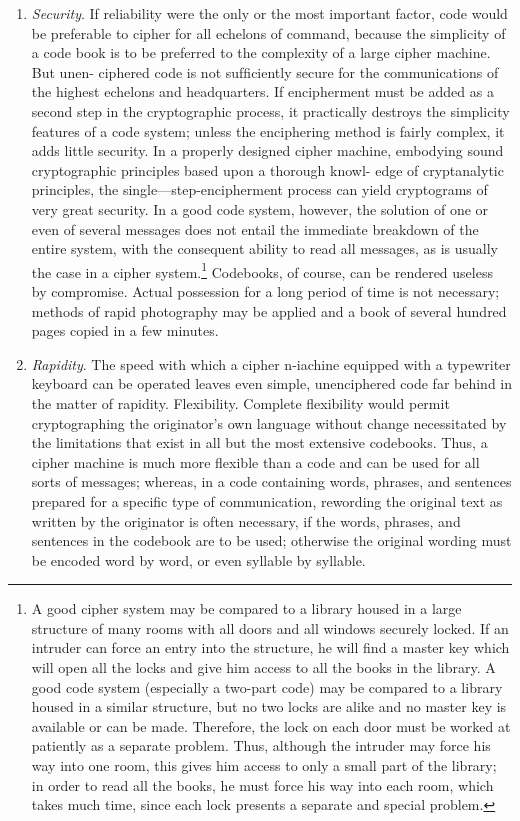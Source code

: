 \begin{enumerate}
\item \textit{Security}. If reliability were the only or the most important
factor, code would be preferable to cipher for all echelons of
command, because the simplicity of a code book is to be preferred to the complexity of a large cipher machine. But unen-
ciphered code is not sufﬁciently secure for the communications
of the highest echelons and headquarters. If encipherment must
be added as a second step in the cryptographic process, it
practically destroys the simplicity features of a code system;
unless the enciphering method is fairly complex, it adds little
security. In a properly designed cipher machine, embodying
sound cryptographic principles based upon a thorough knowl-
edge of cryptanalytic principles, the single—step-encipherment
process can yield cryptograms of very great security. In a good
code system, however, the solution of one or even of several
messages does not entail the immediate breakdown of the
entire system, with the consequent ability to read all messages,
as is usually the case in a cipher system.\footnote{A good cipher system may be compared to a library housed in a large structure of many rooms with all doors and all windows securely locked. If an intruder can force an entry into the structure, he will ﬁnd a master key which will open all the locks and give him access to all the books in the library. A good code system (especially a two-part code) may be compared to a library housed in a similar structure, but no two locks are alike and no master key is available or can be made. Therefore, the lock on each door must be worked at patiently as a separate problem. Thus, although the intruder may force his way into one room, this gives him access to only a small part of the library; in order to read all the books, he must force his way into each room, which takes much time, since each lock presents a separate and special problem.} Codebooks, of course,
can be rendered useless by compromise. Actual possession for
a long period of time is not necessary; methods of rapid
photography may be applied and a book of several hundred
pages copied in a few minutes.

\item \textit{Rapidity}. The speed with which a cipher n-iachine equipped with
a typewriter keyboard can be operated leaves even simple,
unenciphered code far behind in the matter of rapidity.
Flexibility. Complete ﬂexibility would permit cryptographing
the originator’s own language without change necessitated by
the limitations that exist in all but the most extensive codebooks.
Thus, a cipher machine is much more ﬂexible than a code and
can be used for all sorts of messages; whereas, in a code containing words, phrases, and sentences prepared for a speciﬁc
type of communication, rewording the original text as written
by the originator is often necessary, if the words, phrases, and
sentences in the codebook are to be used; otherwise the original
wording must be encoded word by word, or even syllable by
syllable.


\end{enumerate}
